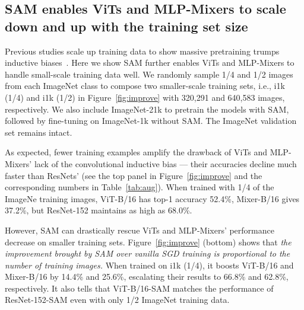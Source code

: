 \documentclass{article}
\newcommand{\XC}[1]{\textcolor{red}{Xiangning: #1}}
\begin{document}
\subsection{SAM enables ViTs and MLP-Mixers to scale down and up with the training set size}
\label{sec:scale}
Previous studies scale up training data to show massive pretraining trumps inductive biases~\cite{dosovitskiy2021an,tolstikhin2021mlpmixer}. %
Here we show SAM further enables ViTs and MLP-Mixers to handle small-scale training data well. %
We randomly sample 1/4 and 1/2 images from each ImageNet class to compose two smaller-scale training sets, i.e., i1k (1/4) and i1k (1/2) in Figure~\ref{fig:improve} with 320,291 and 640,583 images, respectively. We also include ImageNet-21k to pretrain the models with SAM, followed by fine-tuning on ImageNet-1k without SAM. The ImageNet validation set remains intact.

As expected, fewer training examples amplify the drawback of ViTs and MLP-Mixers' lack of the convolutional inductive bias --- their accuracies decline much faster than ResNets' (see the top panel in Figure~\ref{fig:improve} and the corresponding numbers  in Table~\ref{tab:aug}). 
When trained with 1/4 of the ImageNe training images, ViT-B/16 has top-1 accuracy 52.4\%, Mixer-B/16 gives 37.2\%, but ResNet-152  maintains as high as 68.0\%.

However, SAM can drastically rescue ViTs and MLP-Mixers' performance decrease on smaller training sets.  Figure~\ref{fig:improve} (bottom) shows that \textit{the improvement brought by SAM over vanilla SGD training is proportional to the number of training images.} 
When trained on i1k (1/4), it boosts ViT-B/16 and Mixer-B/16 by 14.4\% and 25.6\%, escalating their results to 66.8\% and 62.8\%, respectively. It also tells that ViT-B/16-SAM matches the performance of ResNet-152-SAM even with only 1/2 ImageNet training data. %
\end{document}
